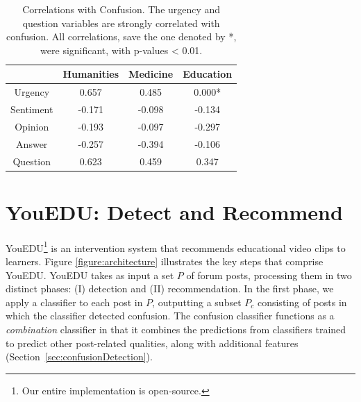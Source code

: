 \documentclass{edm_template}
\begin{document}
\begin{table}
       \centering
       \begin{tabular}{|c|c|c|c|}
       \hline
          & Humanities & Medicine & Education \\ \hline
        Urgency   & 0.657                & 0.485              & 0.000* \\ \hline
        Sentiment & -0.171                & -0.098             & -0.134 \\ \hline
        Opinion   & -0.193                & -0.097             & -0.297 \\ \hline
        Answer    & -0.257                & -0.394             & -0.106  \\ \hline
        Question  & 0.623                & 0.459              & 0.347  \\ \hline
       \end{tabular}
       \caption{\textnormal{
       Correlations with Confusion. The urgency and question variables are strongly correlated with confusion. All correlations, save the one denoted by *, were significant, with p-values < 0.01.
       }} 
       \label{table:correlations} %
\end{table}


\section{YouEDU: Detect and Recommend}
\label{sec:arch}

YouEDU\footnote{Our entire implementation is open-source.} is an intervention system that recommends educational video clips to learners. Figure \ref{figure:architecture} illustrates the key steps that comprise YouEDU. YouEDU takes as input a set $P$ of forum posts, processing them in two distinct phases: (I) detection and (II) recommendation. In the first phase, we apply a classifier to each post in $P$, outputting a subset $P_{c}$ consisting of posts in which the classifier detected confusion. The confusion classifier functions as a \emph{combination} classifier in that it combines the predictions from classifiers trained to predict other post-related qualities, along with additional features (Section~\ref{sec:confusionDetection}).
\end{document}
